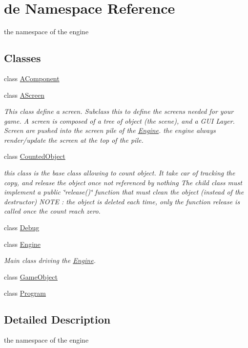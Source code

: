 \hypertarget{namespacede}{
\section{de \-Namespace \-Reference}
\label{namespacede}
}


the namespace of the engine  


\subsection*{\-Classes}
\begin{DoxyCompactItemize}
\item 
class \hyperlink{classde_1_1_a_component}{\-A\-Component}
\item 
class \hyperlink{classde_1_1_a_screen}{\-A\-Screen}
\begin{DoxyCompactList}\small\item\em \-This class define a screen. \-Subclass this to define the screens needed for your game. \-A screen is composed of a tree of object (the scene), and a \-G\-U\-I \-Layer. \-Screen are pushed into the screen pile of the \hyperlink{classde_1_1_engine}{\-Engine}. the engine always render/update the screen at the top of the pile. \end{DoxyCompactList}\item 
class \hyperlink{classde_1_1_counted_object}{\-Counted\-Object}
\begin{DoxyCompactList}\small\item\em this class is the base class allowing to count object. \-It take car of tracking the copy, and release the object once not referenced by nothing \-The child class must implement a public \char`\"{}release()\char`\"{} function that must clean the object (instead of the destructor) \-N\-O\-T\-E \-: the object is deleted each time, only the function release is called once the count reach zero. \end{DoxyCompactList}\item 
class \hyperlink{classde_1_1_debug}{\-Debug}
\item 
class \hyperlink{classde_1_1_engine}{\-Engine}
\begin{DoxyCompactList}\small\item\em \-Main class driving the \hyperlink{classde_1_1_engine}{\-Engine}. \end{DoxyCompactList}\item 
class \hyperlink{classde_1_1_game_object}{\-Game\-Object}
\item 
class \hyperlink{classde_1_1_program}{\-Program}
\end{DoxyCompactItemize}


\subsection{\-Detailed \-Description}
the namespace of the engine 